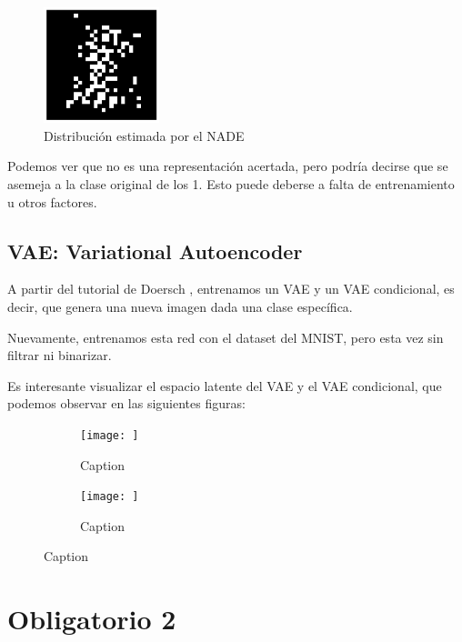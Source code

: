 \documentclass[11pt]{article}
\begin{document}
\begin{figure}[h]
    \centering
    \includegraphics[width=0.3\textwidth]{NADE/nade_generation.png}
    \caption{Distribución estimada por el NADE}
    \label{fig:nade_gen}
\end{figure}

Podemos ver que no es una representación acertada, pero podría decirse que se asemeja a la clase original de los 1. Esto puede deberse a falta de entrenamiento u otros factores.
\newpage
\subsection{VAE: Variational Autoencoder}

A partir del tutorial de Doersch \cite{vae}, entrenamos un VAE y un VAE condicional, es decir, que genera una nueva imagen dada una clase específica.

Nuevamente, entrenamos esta red con el dataset del MNIST, pero esta vez sin filtrar ni binarizar.

Es interesante visualizar el espacio latente del VAE y el VAE condicional, que podemos observar en las siguientes figuras:

\begin{figure}
\begin{subfigure}[h]{0.45\linewidth}
    \centering
    \texttt{[image: ]}
    \caption{Caption}
    \label{fig:enter-label}
\end{subfigure}
\begin{subfigure}[h]{0.45\linewidth}
    \centering
    \texttt{[image: ]}
    \caption{Caption}
    \label{fig:enter-label}
\end{subfigure}
\end{figure}

\newpage
\section{Obligatorio 2}

\newpage



\end{document}
